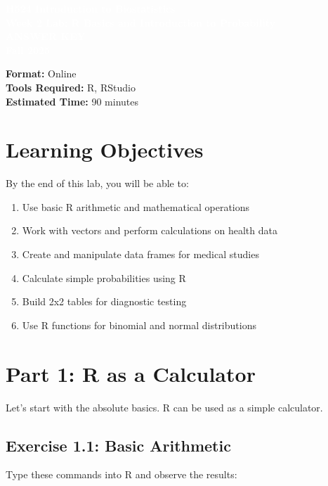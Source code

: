 \documentclass[11pt]{article}
\title{}
\author{}
\date{}
\begin{document}
\begin{tcolorbox}[colback=osaorange,colframe=black,boxrule=2pt,arc=0pt,left=3pt,right=3pt,top=6pt,bottom=6pt,boxsep=2pt]
\centering
\textcolor{white}{\textbf{\Large H524 Introduction to Biostatistics}}\\
\textcolor{white}{\textbf{\Large Week 2 Lab: R Basics and Introduction to Probability}}\\
\textcolor{white}{\textbf{\Large ANSWER KEY}}\\
\textcolor{white}{\textbf{\Large Fall 2025}}
\end{tcolorbox}

\vspace{8pt}

\noindent\textbf{Format:} Online\\
\textbf{Tools Required:} R, RStudio\\
\textbf{Estimated Time:} 90 minutes

\section{Learning Objectives}

By the end of this lab, you will be able to:
\begin{enumerate}
\item Use basic R arithmetic and mathematical operations
\item Work with vectors and perform calculations on health data
\item Create and manipulate data frames for medical studies
\item Calculate simple probabilities using R
\item Build 2x2 tables for diagnostic testing
\item Use R functions for binomial and normal distributions
\end{enumerate}

\section{Part 1: R as a Calculator}

Let's start with the absolute basics. R can be used as a simple calculator.

\subsection{Exercise 1.1: Basic Arithmetic}

Type these commands into R and observe the results:
\end{document}
